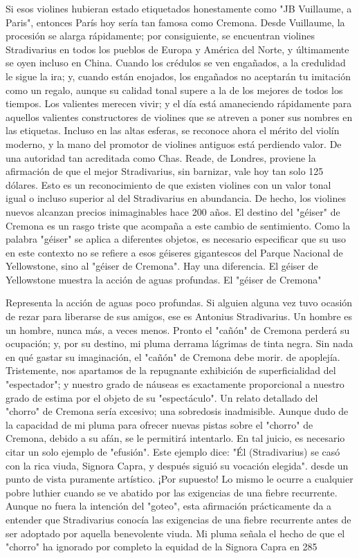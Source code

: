 Si esos violines hubieran estado etiquetados honestamente como "JB Vuillaume, a Paris", entonces París hoy sería tan famosa como Cremona.
Desde Vuillaume, la procesión se alarga rápidamente; por consiguiente, se encuentran violines Stradivarius en todos los pueblos de Europa y América del Norte, y últimamente se oyen incluso en China.
Cuando los crédulos se ven engañados, a la credulidad le sigue la ira; y, cuando están enojados, los engañados no aceptarán tu imitación como un regalo, aunque su calidad tonal supere a la de los mejores de todos los tiempos.
Los valientes merecen vivir; y el día está amaneciendo rápidamente para aquellos valientes constructores de violines que se atreven a poner sus nombres en las etiquetas. Incluso en las altas esferas, se reconoce ahora el mérito del violín moderno, y la mano del promotor de violines antiguos está perdiendo valor. De una autoridad tan acreditada como Chas. Reade, de Londres, proviene la afirmación de que el mejor Stradivarius, sin barnizar, vale hoy tan solo 125 dólares. Esto es un reconocimiento de que existen violines con un valor tonal igual o incluso superior al del Stradivarius en abundancia. De hecho, los violines nuevos alcanzan precios inimaginables hace 200 años. El destino del "géiser" de Cremona es un rasgo triste que acompaña a este cambio de sentimiento. Como la palabra "géiser" se aplica a diferentes objetos, es necesario especificar que su uso en este contexto no se refiere a esos géiseres gigantescos del Parque Nacional de Yellowstone, sino al "géiser de Cremona". Hay una diferencia. El géiser de Yellowstone muestra la acción de aguas profundas. El "géiser de Cremona"


Representa la acción de aguas poco profundas. Si alguien alguna vez tuvo ocasión de rezar para liberarse de sus amigos, ese es Antonius Stradivarius. Un hombre es un hombre, nunca más, a veces menos.
Pronto el "cañón" de Cremona perderá su ocupación; y, por su destino, mi pluma derrama lágrimas de tinta negra. Sin nada en qué gastar su imaginación, el "cañón" de Cremona debe morir.
de apoplejía. Tristemente, nos apartamos de la repugnante exhibición de superficialidad del "espectador"; y nuestro grado de náuseas es exactamente proporcional a nuestro grado de estima por el objeto de su "espectáculo".
Un relato detallado del "chorro" de Cremona sería excesivo; una sobredosis inadmisible. Aunque dudo de la capacidad de mi pluma para ofrecer nuevas pistas sobre el "chorro" de Cremona, debido a su afán, se le permitirá intentarlo.
En tal juicio, es necesario citar un solo ejemplo de "efusión". Este ejemplo dice: "Él (Stradivarius) se casó con la rica viuda, Signora Capra, y después siguió su vocación elegida".
desde un punto de vista puramente artístico. ¡Por supuesto!
Lo mismo le ocurre a cualquier pobre luthier cuando se ve abatido por las exigencias de una fiebre recurrente. Aunque no fuera la intención del "goteo", esta afirmación prácticamente da a entender que Stradivarius conocía las exigencias de una fiebre recurrente antes de ser adoptado por aquella benevolente viuda.
Mi pluma señala el hecho de que el "chorro" ha ignorado por completo la equidad de la Signora Capra en
285

